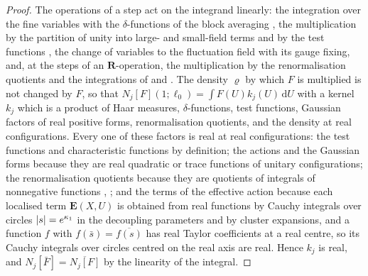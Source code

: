 \documentclass[11pt]{preprint}
\newcommand{\dd}{\mathrm{d}}
\DeclarePairedDelimiter{\abs}{\lvert}{\rvert}
\numberwithin{equation}{section}
\theoremstyle{definition}
\theoremstyle{remark}
\theoremstyle{plain}
\begin{document}
\begin{proof}
The operations of a step act on the integrand linearly: the integration over the fine variables with the $\delta$-functions of the block averaging \cite[(2.17)--(2.18), p.~269]{BalabanRG1}, the multiplication by the partition of unity into large- and small-field terms and by the test functions \cite[(3.6)--(3.9), pp.~265--266]{BalabanCRE}, the change of variables to the fluctuation field with its gauge fixing, and, at the steps of an $\mathbf R$-operation, the multiplication by the renormalisation quotients and the integrations of \cite[(0.4)--(0.5), p.~176]{BalabanLFR1} and \cite[(1.70)--(1.72), pp.~377--378]{BalabanLFR2}. The density $\varrho$ by which $F$ is multiplied is not changed by $F$, so that $N_j[F](1; \ell_0) = \int F(U)k_j(U)\,\dd U$ with a kernel $k_j$ which is a product of Haar measures, $\delta$-functions, test functions, Gaussian factors of real positive forms, renormalisation quotients, and the density at real configurations. Every one of these factors is real at real configurations: the test functions and characteristic functions by definition; the actions and the Gaussian forms because they are real quadratic or trace functions of unitary configurations; the renormalisation quotients because they are quotients of integrals of nonnegative functions \cite[p.~176]{BalabanLFR1}, \cite[p.~380]{BalabanLFR2}; and the terms of the effective action because each localised term $\mathbf E(X, U)$ is obtained from real functions by Cauchy integrals over circles $\abs s = e^{\kappa_1}$ in the decoupling parameters \cite[(1.23), p.~7]{BalabanRG2} and by cluster expansions, and a function $f$ with $f(\bar s) = \overline{f(s)}$ has real Taylor coefficients at a real centre, so its Cauchy integrals over circles centred on the real axis are real. Hence $k_j$ is real, and $N_j[\bar F] = \overline{N_j[F]}$ by the linearity of the integral.


\end{proof}
\end{document}
